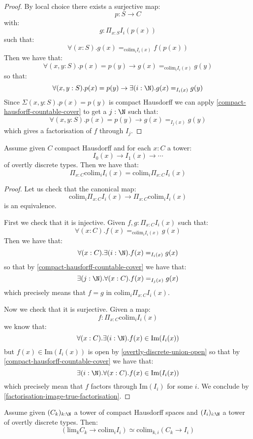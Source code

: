 \begin{proof}
By local choice there exists a surjective map:
\[p:S\to C\]
with:
\[g:\Pi_{x:S} I_i(p(x))\]
such that:
\[\forall(x:S). g(x) =_{\mathrm{colim}_i I_i(x)} f(p(x))\]
Then we have that:
\[\forall(x,y:S). p(x)=p(y) \to g(x) =_{\mathrm{colim}_i I_i(x)} g(y)\]
so that:
\[\forall(x,y:S). p(x)=p(y) \to \exists(i:\N). g(x) =_{I_i(x)} g(y)\]
Since $\Sigma(x,y:S). p(x)=p(y)$ is compact Hausdorff we can apply \cref{compact-hausforff-countable-cover} to get a $j:\N$ such that:
\[\forall(x,y:S). p(x)=p(y) \to g(x) =_{I_j(x)} g(y)\]
which gives a factorisation of $f$ through $I_j$.
\end{proof}

\begin{proposition}\label{scott-continuity-right}
Assume given $C$ compact Hausdorff and for each $x:C$ a tower:
\[I_0(x)\to I_1(x)\to \cdots\]
of overtly discrete types. Then we have that:
\[\Pi_{x:C} \mathrm{colim}_{i} I_i(x) = \mathrm{colim}_{i} \Pi_{x:C} I_i(x)\]
\end{proposition}

\begin{proof}
Let us check that the canonical map:
\[\mathrm{colim}_i \Pi_{x:C} I_i(x) \to \Pi_{x:C} \mathrm{colim}_i I_i(x) \]
is an equivalence. 

First we check that it is injective. Given $f,g:\Pi_{x:C} I_i(x)$ such that:
\[\forall(x:C).  f(x) =_{\mathrm{colim}_iI_i(x)} g(x)\]
Then we have that:
\[\forall(x:C).  \exists(i:\N). f(x) =_{I_i(x)} g(x)\]
so that by \cref{compact-hausforff-countable-cover} we have that:
\[\exists(j:\N). \forall(x:C). f(x) =_{I_j(x)} g(x)\]
which precisely means that $f=g$ in $\mathrm{colim}_i \Pi_{x:C} I_i(x)$.

Now we check that it is surjective. Given a map:
\[f: \Pi_{x:C} \mathrm{colim}_i I_i(x)\]
we know that:
\[\forall(x:C). \exists(i:\N). f(x)\in \mathrm{Im}(I_i(x))\]
but $f(x)\in \mathrm{Im}(I_i(x))$ is open by \cref{overtly-discrete-union-open} so that by \cref{compact-hausforff-countable-cover} we have that:
\[\exists(i:\N). \forall(x:C).  f(x)\in \mathrm{Im}(I_i(x))\]
which precisely mean that $f$ factors through $\mathrm{Im}(I_i)$ for some $i$. We conclude by \cref{factorisation-image-true-factorisation}.
\end{proof}

\begin{proposition}\label{scott-continuity}
Assume given $(C_k)_{k:\N}$ a tower of compact Hausdorff spaces and $(I_i)_{i:\N}$ a tower of overtly discrete types. Then:
\[\left( \mathrm{lim}_k C_k \to \mathrm{colim}_i I_i\right) \simeq \mathrm{colim}_{k,i} (C_k\to I_i)\]
\end{proposition}

